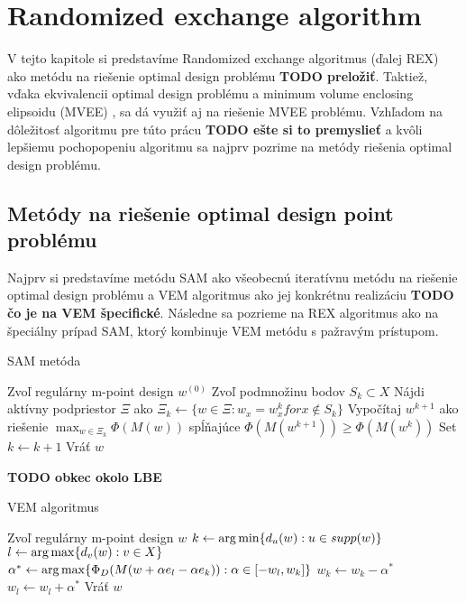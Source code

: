 \chapter{Randomized exchange algorithm}

V tejto kapitole si predstavíme Randomized exchange algoritmus \cite{rex_harman} (ďalej REX) ako metódu na riešenie optimal design problému \textbf{TODO preložiť}. Taktiež, vďaka ekvivalencii optimal design problému a minimum volume enclosing elipsoidu (MVEE) \cite{rex_harman}, sa dá využiť aj na riešenie MVEE problému.
Vzhľadom na dôležitosť algoritmu pre túto prácu \textbf{TODO ešte si to premyslieť} a kvôli lepšiemu pochopopeniu algoritmu sa najprv pozrime na metódy riešenia optimal design problému.

\section{Metódy na riešenie optimal design point problému}

Najprv si predstavíme metódu SAM ako všeobecnú iteratívnu metódu na riešenie optimal design problému a VEM algoritmus ako jej konkrétnu realizáciu \textbf{TODO čo je na VEM špecifické}. Následne sa pozrieme na REX algoritmus ako na špeciálny prípad SAM, ktorý kombinuje VEM metódu s pažravým prístupom.

\begin{algorithm}[H]
	\caption{SAM metóda \cite{rex_harman}}
	\label{sam}
	\begin{algorithmic}[1]
		\State Zvoľ regulárny m-point design $w^{(0)}$
			\State Zvoľ podmnožinu bodov $S_k \subset X$
			\State Nájdi aktívny podpriestor $\Xi$ ako $\Xi_k \leftarrow \{ w \in \Xi : w_x = w_x^k for x \not \in S_k \}$
			\State Vypočítaj $w^{k+1}$ ako riešenie $\max_{w \in \Xi_k} \Phi(M(w))$ spĺňajúce $\Phi(M(w^{k+1})) \geq \Phi(M(w^k))$
			\State Set $k \leftarrow k+1$
		\EndWhile
		\State Vráť $w$
	\end{algorithmic}
\end{algorithm}

\textbf{TODO obkec okolo LBE}

\begin{algorithm}[H]
	\caption{VEM algoritmus \cite{rex_harman}}
	\label{vem}
	\begin{algorithmic}[1]
		\State Zvoľ regulárny m-point design $w$
			\State $k \leftarrow \operatorname*{arg\,min} \{ d_u(w) : u \in supp(w)\}$
			\State $l \leftarrow \operatorname*{arg\,max} \{ d_v(w) : v \in X \}$
			\State $\alpha^* \leftarrow \operatorname*{arg\,max} \{ \Phi_D (M(w+\alpha e_l -\alpha e_k)) : \alpha \in [-w_l, w_k] \}$
			\State $w_k \leftarrow w_k - \alpha^*$
			\State $w_l \leftarrow w_l + \alpha^*$
		\EndWhile
		\State Vráť $w$
	\end{algorithmic}
\end{algorithm}

